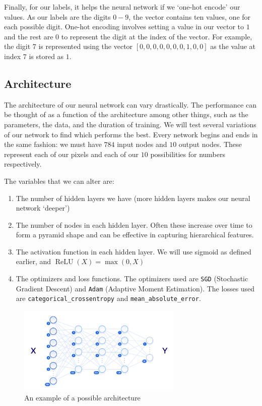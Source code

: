 \documentclass[a4paper,11pt]{article}
\theoremstyle{plain} %
\theoremstyle{definition} %
\theoremstyle{remark} %
\begin{document}
Finally, for our labels, it helps the neural network if we `one-hot encode' our values. As our labels are the digits $0-9$, the vector contains ten values, one for each possible digit. One-hot encoding involves setting a value in our vector to $1$ and the rest are $0$ to represent the digit at the index of the vector. For example, the digit $7$ is represented using the vector $[0, 0, 0, 0, 0, 0, 0, 1, 0, 0]$ as the value at index $7$ is stored as $1$.

\subsection{Architecture}

The architecture of our neural network can vary drastically. The performance can be thought of as a function of the architecture among other things, such as the parameters, the data, and the duration of training. We will test several variations of our network to find which performs the best. Every network begins and ends in the same fashion: we must have $784$ input nodes and $10$ output nodes. These represent each of our pixels and each of our $10$ possibilities for numbers respectively. 

The variables that we can alter are:
\begin{enumerate}
    \item The number of hidden layers we have (more hidden layers makes our neural network `deeper')
    \item The number of nodes in each hidden layer. Often these increase over time to form a pyramid shape and can be effective in capturing hierarchical features.
    \item The activation function in each hidden layer. We will use sigmoid as defined earlier, and $\operatorname{ReLU}(X)=\operatorname{max}(0,X)$
    \item The optimizers and loss functions. The optimizers used are \texttt{SGD} (Stochastic Gradient Descent) and \texttt{Adam} (Adaptive Moment Estimation). The losses used are \texttt{categorical\_crossentropy} and \texttt{mean\_absolute\_error}.

\end{enumerate}

\begin{figure}[htb]
	\centering 
	\includegraphics[width=0.7\textwidth, angle=0]{cnwitLM.png}	
	\caption{An example of a possible architecture \citep{digitaloceanBuildNeural}} 
	\label{MNIST}%
\end{figure}
\end{document}
